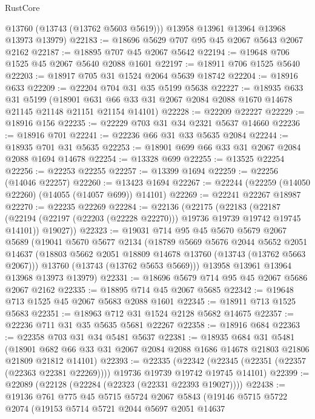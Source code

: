 \begin{lexlean}{RustCore}
\begin{coremodule}
        @13760
        (@13743 (@13762 @5603 @5619)))
      @13958
      @13961
      @13964
      @13968
      @13973
      @13979)
@22183 := @18696 @5629 @707 @95 @45 @2067 @5643 @2067 @2162
@22187 := @18895 @707 @45 @2067 @5642
@22194 := @19648 @706 @1525 @45 @2067 @5640 @2088 @1601
@22197 := @18911 @706 @1525 @5640
@22203 := @18917 @705 @31 @1524 @2064 @5639 @18742
@22204 := @18916 @633
@22209 := @22204 @704 @31 @35 @5199 @5638
@22227 := @18935
    @633
    @31
    @5199
    (@18901 @631 @66 @33 @31 @2067 @2084 @2088 @1670 @14678 @21145 @21148 @21151 @21154 @14101)
@22228 := @22209 @22227
@22229 := @18916 @156
@22235 := @22229 @703 @31 @34 @2321 @5637 @14660
@22236 := @18916 @701
@22241 := @22236 @66 @31 @33 @5635 @2084
@22244 := @18935 @701 @31 @5635
@22253 := @18901 @699 @66 @33 @31 @2067 @2084 @2088 @1694 @14678
@22254 := @13328 @699
@22255 := @13525 @22254
@22256 := @22253 @22255
@22257 := @13399 @1694
@22259 := @22256 (@14046 @22257)
@22260 := @13423 @1694
@22267 := @22244 (@22259 (@14050 @22260) (@14055 (@14057 @699)) @14101)
@22269 := @22241 @22267 @18987
@22270 := @22235 @22269
@22284 := @22136
    (@22175
      (@22183
        (@22187 (@22194 (@22197 (@22203 (@22228 @22270))) @19736 @19739 @19742 @19745 @14101))
        @19027))
@22323 := @19031
    @714
    @95
    @45
    @5670
    @5679
    @2067
    @5689
    (@19041
      @5670
      @5677
      @2134
      (@18789
        @5669
        @5676
        @2044
        @5652
        @2051
        @14637
        (@18803 @5662 @2051 @18809 @14678 @13760 (@13743 (@13762 @5663 @2067)))
        @13760
        (@13743 (@13762 @5653 @5669)))
      @13958
      @13961
      @13964
      @13968
      @13973
      @13979)
@22331 := @18696 @5679 @714 @95 @45 @2067 @5686 @2067 @2162
@22335 := @18895 @714 @45 @2067 @5685
@22342 := @19648 @713 @1525 @45 @2067 @5683 @2088 @1601
@22345 := @18911 @713 @1525 @5683
@22351 := @18963 @712 @31 @1524 @2128 @5682 @14675
@22357 := @22236 @711 @31 @35 @5635 @5681 @22267
@22358 := @18916 @684
@22363 := @22358 @703 @31 @34 @5481 @5637
@22381 := @18935
    @684
    @31
    @5481
    (@18901 @682 @66 @33 @31 @2067 @2084 @2088 @1686 @14678 @21803 @21806 @21809 @21812 @14101)
@22393 := @22335
    (@22342 (@22345 (@22351 (@22357 (@22363 @22381 @22269)))) @19736 @19739 @19742 @19745 @14101)
@22399 := @22089 (@22128 (@22284 (@22323 (@22331 @22393 @19027))))
@22438 := @19136
    @761
    @775
    @45
    @5715
    @5724
    @2067
    @5843
    (@19146
      @5715
      @5722
      @2074
      (@19153
        @5714
        @5721
        @2044
        @5697
        @2051
        @14637

\end{coremodule}
\end{lexlean}
